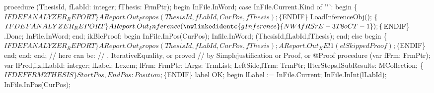 procedure (ThesisId, fLabId: integer; fThesis: FrmPtr);
begin
   InFile.InWord;
   case InFile.Current.Kind of
      '"':
         begin
            \{$IFDEF ANALYZER_REPORT\}
            AReport.Out_Propos(ThesisId, fLabId, CurPos, fThesis);
            \{$ENDIF\}
            LoadInferenceObj();
            \{$IFDEF ANALYZER_REPORT\}
            AReport.Out_Inference(\nwlinkedidentc{gInference}{NW4fRSrE-3T8oCT-1});
            \{$ENDIF\}
            .Done;
            InFile.InWord;
         end;
      ikBlcProof:
         begin
            InFile.InPos(CurPos);
            Infile.InWord;
            (ThesisId,fLabId,fThesis);
         end;
      else
         begin
            \{$IFDEF ANALYZER_REPORT\}
            AReport.Out_Propos(ThesisId, fLabId, CurPos, fThesis);
            AReport.Out_XEl1(elSkippedProof);
            \{$ENDIF\}
         end;
   end;
end;
\eatline
{}\nwendcode{}\nwdocspar
\nwenddocs{}\endmoddef\nwstartdeflinemarkup{}\nwenddeflinemarkup
//  here can be:
// , IterativeEquality, or  proved
// by Simplejustification or Proof, or @Proof
procedure (var fFrm: FrmPtr);
var
   lPred,i,z,lLabId: integer;
   lLabel: Lexem;
   lFrm: FrmPtr;
   lArgs: TrmList;
   LeftSide,lTrm: TrmPtr;
   lIterSteps,lSubResults: MCollection;
   \{$IFDEF FRM2THESIS\}   
   StartPos, EndPos: Position;
   \{$ENDIF\}
label OK;
begin
   lLabel := InFile.Current;
   InFile.InInt(lLabId);
   InFile.InPos(CurPos);
